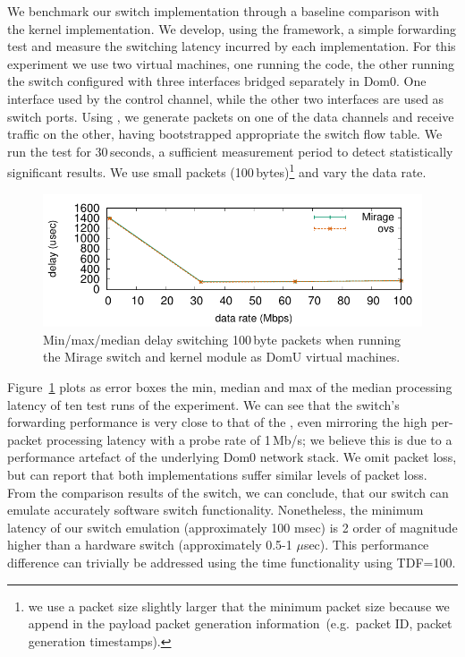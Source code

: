 We benchmark our \mirage \of switch implementation through a baseline comparison
with the \ovs kernel implementation.  We develop, using
the \oflops framework, a simple forwarding test and measure the switching
latency incurred by each implementation.  For this experiment we use two virtual
machines, one running the \oflops code, the other running the \of switch
configured with three interfaces bridged separately in Dom0. One interface
used by the \of control channel, while the other two interfaces are used as 
switch ports. Using \oflops, we generate packets on one of the data
channels and receive traffic on the other, having bootstrapped appropriate the
switch flow table. We run the test for 30\,seconds, a sufficient measurement
period to detect statistically significant results. We use small packets
(100\,bytes)\footnote{we use a packet size slightly larger that the minimum
  packet size because we append in the payload packet generation
  information~(e.g.~packet ID, packet generation timestamps).} and vary the data
rate.

\begin{figure}
\centering
\includegraphics[width=\columnwidth]{Chapter1/Chapter1Figs/switch-media-delay}
\caption[\of switch data pane evaluation]{\label{fig:switch}Min/max/median delay switching 100\,byte packets
        when running the Mirage switch and \ovs kernel module as DomU
        virtual machines.}
\end{figure}

Figure~\ref{fig:switch} plots as error boxes the min, median and max of the
median processing latency of ten test runs of the experiment. We can see that
the \mirage switch's forwarding performance is very close to that of the \ovs,
even mirroring the high per-packet processing latency with a probe rate of
1\,Mb/s; we believe this is due to a performance artefact of the underlying Dom0
network stack. We omit packet loss, but can report that both implementations
suffer similar levels of packet loss.  From the comparison results of the
\mirage \of switch, we can conclude, that our \of switch can emulate accurately
software switch functionality. Nonetheless, the minimum latency of our switch
emulation (approximately 100 msec) is 2 order of magnitude higher than a
hardware switch (approximately 0.5-1 $\mu$sec). This performance difference can
trivially be addressed using the time functionality using TDF=100.

